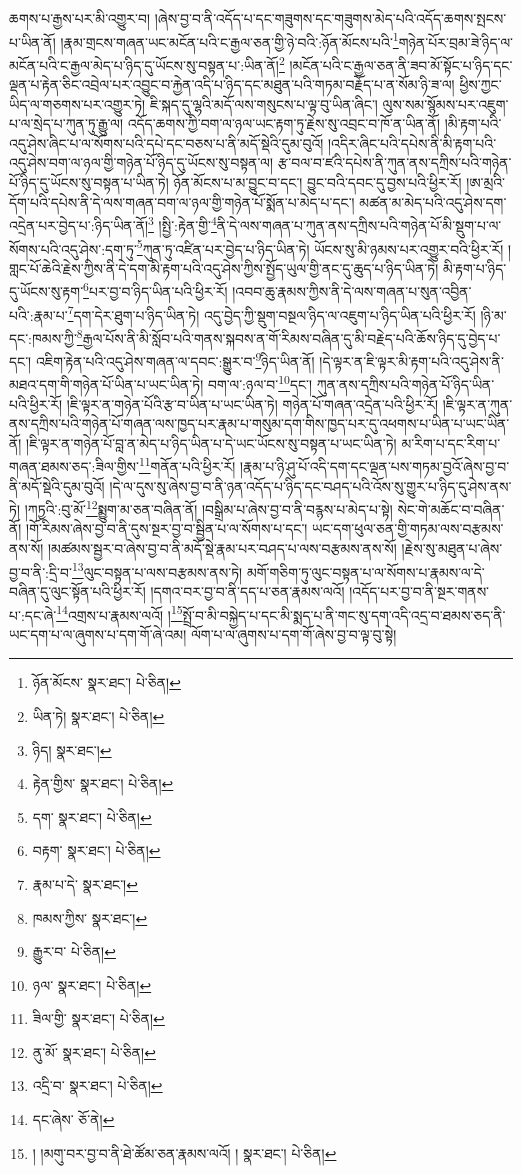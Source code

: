 ཆགས་པ་རྒྱས་པར་མི་འགྱུར་བ། །ཞེས་བྱ་བ་ནི་འདོད་པ་དང་གཟུགས་དང་གཟུགས་མེད་པའི་འདོད་ཆགས་སྤངས་པ་ཡིན་ནོ། །རྣམ་གྲངས་གཞན་ཡང་མངོན་པའི་ང་རྒྱལ་ཅན་གྱི་ཉེ་བའི་:ཉོན་མོངས་པའི་\footnote{ཉོན་མོངས་  སྣར་ཐང་།  པེ་ཅིན། }གཉེན་པོར་བྲམ་ཟེ་ཉིད་ལ་མངོན་པའི་ང་རྒྱལ་མེད་པ་ཉིད་དུ་ཡོངས་སུ་བསྟན་པ་:ཡིན་ནོ།\footnote{ཡིན་ཏེ།  སྣར་ཐང་།  པེ་ཅིན། } །མངོན་པའི་ང་རྒྱལ་ཅན་ནི་ཟབ་མོ་སྟོང་པ་ཉིད་དང་ལྡན་པ་རྟེན་ཅིང་འབྲེལ་པར་འབྱུང་བ་རྐྱེན་འདི་པ་ཉིད་དང་མཐུན་པའི་གཏམ་བརྗོད་པ་ན་སོམ་ཉི་ཟ་ལ། ཕྱིས་ཀྱང་ཡིད་ལ་གཅགས་པར་འགྱུར་ཏེ། ཇི་སྐད་དུ་ལྷའི་མདོ་ལས་གསུངས་པ་ལྟ་བུ་ཡིན་ཞིང་། ལུས་སམ་སྙོམས་པར་འཇུག་པ་ལ་སྲེད་པ་ཀུན་ཏུ་རྒྱུ་ལ། འདོད་ཆགས་ཀྱི་བག་ལ་ཉལ་ཡང་རྟག་ཏུ་རྗེས་སུ་འབྲང་བ་ཁོ་ན་ཡིན་ནོ། །མི་རྟག་པའི་འདུ་ཤེས་ཞིང་པ་ལ་སོགས་པའི་དཔེ་དང་བཅས་པ་ནི་མདོ་སྡེའི་དུམ་བུའོ། །འདིར་ཞིང་པའི་དཔེས་ནི་མི་རྟག་པའི་འདུ་ཤེས་བག་ལ་ཉལ་གྱི་གཉེན་པོ་ཉིད་དུ་ཡོངས་སུ་བསྟན་ལ། རྩ་བལ་བ་ཛའི་དཔེས་ནི་ཀུན་ནས་དཀྲིས་པའི་གཉེན་པོ་ཉིད་དུ་ཡོངས་སུ་བསྟན་པ་ཡིན་ཏེ། ཉོན་མོངས་པ་མ་བྱུང་བ་དང་། བྱུང་བའི་དབང་དུ་བྱས་པའི་ཕྱིར་རོ། །ཨ་མྲའི་དོག་པའི་དཔེས་ནི་དེ་ལས་གཞན་བག་ལ་ཉལ་གྱི་གཉེན་པོ་སྨོན་པ་མེད་པ་དང་། མཚན་མ་མེད་པའི་འདུ་ཤེས་དག་འདྲེན་པར་བྱེད་པ་:ཉིད་ཡིན་ནོ།\footnote{ཉིད།  སྣར་ཐང་། } །སྤྱི་:རྟེན་གྱི་\footnote{རྟེན་གྱིས་  སྣར་ཐང་།  པེ་ཅིན། }ནི་དེ་ལས་གཞན་པ་ཀུན་ནས་དཀྲིས་པའི་གཉེན་པོ་མི་སྡུག་པ་ལ་སོགས་པའི་འདུ་ཤེས་:དག་ཏུ་\footnote{དག་  སྣར་ཐང་།  པེ་ཅིན། }ཀུན་ཏུ་འཛིན་པར་བྱེད་པ་ཉིད་ཡིན་ཏེ། ཡོངས་སུ་མི་ཉམས་པར་འགྱུར་བའི་ཕྱིར་རོ། །གླང་པོ་ཆེའི་རྗེས་ཀྱིས་ནི་དེ་དག་མི་རྟག་པའི་འདུ་ཤེས་ཀྱིས་སྤྱོད་ཡུལ་གྱི་ནང་དུ་ཆུད་པ་ཉིད་ཡིན་ཏེ། མི་རྟག་པ་ཉིད་དུ་ཡོངས་སུ་རྟག་\footnote{བརྟག་  སྣར་ཐང་།  པེ་ཅིན། }པར་བྱ་བ་ཉིད་ཡིན་པའི་ཕྱིར་རོ། །འབབ་ཆུ་རྣམས་ཀྱིས་ནི་དེ་ལས་གཞན་པ་སུན་འབྱིན་པའི་:རྣམ་པ་\footnote{རྣམ་པ་དེ་  སྣར་ཐང་། }དག་དེར་ཐུག་པ་ཉིད་ཡིན་ཏེ། འདུ་བྱེད་ཀྱི་སྡུག་བསྔལ་ཉིད་ལ་འཇུག་པ་ཉིད་ཡིན་པའི་ཕྱིར་རོ། །ཉི་མ་དང་:ཁམས་ཀྱི་\footnote{ཁམས་ཀྱིས་  སྣར་ཐང་། }རྒྱལ་པོས་ནི་མི་སློབ་པའི་གནས་སྐབས་ན་གོ་རིམས་བཞིན་དུ་མི་བརྗེད་པའི་ཆོས་ཉིད་དུ་བྱེད་པ་དང་། འཇིག་རྟེན་པའི་འདུ་ཤེས་གཞན་ལ་དབང་:སྒྱུར་བ་\footnote{རྒྱུར་བ་  པེ་ཅིན། }ཉིད་ཡིན་ནོ། །དེ་ལྟར་ན་ཇི་ལྟར་མི་རྟག་པའི་འདུ་ཤེས་ནི་མཐའ་དག་གི་གཉེན་པོ་ཡིན་པ་ཡང་ཡིན་ཏེ། བག་ལ་:ཉལ་བ་\footnote{ཉལ་  སྣར་ཐང་།  པེ་ཅིན། }དང་། ཀུན་ནས་དཀྲིས་པའི་གཉེན་པོ་ཉིད་ཡིན་པའི་ཕྱིར་རོ། །ཇི་ལྟར་ན་གཉེན་པོའི་རྩ་བ་ཡིན་པ་ཡང་ཡིན་ཏེ། གཉེན་པོ་གཞན་འདྲེན་པའི་ཕྱིར་རོ། །ཇི་ལྟར་ན་ཀུན་ནས་དཀྲིས་པའི་གཉེན་པོ་གཞན་ལས་ཁྱད་པར་རྣམ་པ་གསུམ་དག་གིས་ཁྱད་པར་དུ་འཕགས་པ་ཡིན་པ་ཡང་ཡིན་ནོ། །ཇི་ལྟར་ན་གཉེན་པོ་བླ་ན་མེད་པ་ཉིད་ཡིན་པ་དེ་ཡང་ཡོངས་སུ་བསྟན་པ་ཡང་ཡིན་ཏེ། མ་རིག་པ་དང་རིག་པ་གཞན་ཐམས་ཅད་:ཟིལ་གྱིས་\footnote{ཟིལ་གྱི་  སྣར་ཐང་།  པེ་ཅིན། }གནོན་པའི་ཕྱིར་རོ། །རྣམ་པ་ཉི་ཤུ་པོ་འདི་དག་དང་ལྡན་པས་གཏམ་བྱའོ་ཞེས་བྱ་བ་ནི་མདོ་སྡེའི་དུམ་བུའོ། །དེ་ལ་དུས་སུ་ཞེས་བྱ་བ་ནི་ཉན་འདོད་པ་ཉིད་དང་བཤད་པའི་འོས་སུ་གྱུར་པ་ཉིད་དུ་ཤེས་ནས་ཏེ། །ཀཏྱའི་:བུ་མོ་\footnote{ནུ་མོ་  སྣར་ཐང་།  པེ་ཅིན། }སྨྱུག་མ་ཅན་བཞིན་ནོ། །བསྒྲིམ་པ་ཞེས་བྱ་བ་ནི་བརྙས་པ་མེད་པ་སྟེ། སེང་གེ་མཆོང་བ་བཞིན་ནོ། །གོ་རིམས་ཞེས་བྱ་བ་ནི་དུས་སྔར་བྱ་བ་སྦྱིན་པ་ལ་སོགས་པ་དང་། ཡང་དག་ཕུལ་ཅན་གྱི་གཏམ་ལས་བརྩམས་ནས་སོ། །མཚམས་སྦྱར་བ་ཞེས་བྱ་བ་ནི་མདོ་སྡེ་རྣམ་པར་བཤད་པ་ལས་བརྩམས་ནས་སོ། །རྗེས་སུ་མཐུན་པ་ཞེས་བྱ་བ་ནི་:དྲི་བ་\footnote{འདྲི་བ་  སྣར་ཐང་།  པེ་ཅིན། }ལུང་བསྟན་པ་ལས་བརྩམས་ནས་ཏེ། མགོ་གཅིག་ཏུ་ལུང་བསྟན་པ་ལ་སོགས་པ་རྣམས་ལ་དེ་བཞིན་དུ་ལུང་སྟོན་པའི་ཕྱིར་རོ། །དགའ་བར་བྱ་བ་ནི་དད་པ་ཅན་རྣམས་ལའོ། །འདོད་པར་བྱ་བ་ནི་སྔར་གནས་པ་:དང་ཞེ་\footnote{དང་ཞེས་  ཅོ་ནེ། }འགྲས་པ་རྣམས་ལའོ། །\footnote{། །མགུ་བར་བྱ་བ་ནི་ཐེ་ཚོམ་ཅན་རྣམས་ལའོ། །  སྣར་ཐང་།  པེ་ཅིན། }སྤྲོ་བ་མི་བསྐྱེད་པ་དང་མི་སྨད་པ་ནི་གང་སུ་དག་འདི་འདྲ་བ་ཐམས་ཅད་ནི་ཡང་དག་པ་ལ་ཞུགས་པ་དག་གོ་ཞེ་འམ། ལོག་པ་ལ་ཞུགས་པ་དག་གོ་ཞེས་བྱ་བ་ལྟ་བུ་སྟེ། 